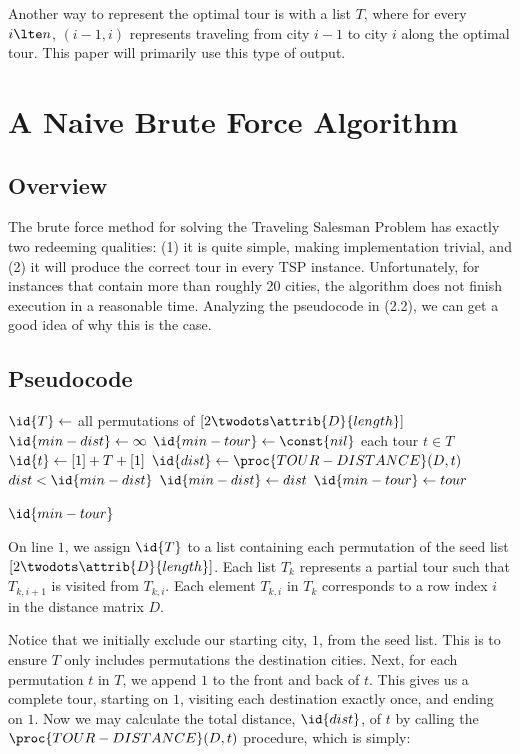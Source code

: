 \documentclass[11pt,fleqn]{article}
\begin{document}
Another way to represent the optimal tour is with a list
$T$, where for every $i \lte n$, $(i-1, i)$ represents
traveling from city $i-1$ to city $i$ along the optimal
tour.  This paper will primarily use this type of output.


\section{A Naive Brute Force Algorithm}
\subsection{Overview}
The brute force method for solving the Traveling Salesman Problem has exactly
two redeeming qualities: (1) it is quite simple, making implementation
trivial, and (2) it will produce the correct tour in every TSP instance.
Unfortunately, for instances that contain more than roughly 20 cities, the
algorithm does not finish execution in a reasonable time.  Analyzing the
pseudocode in (2.2), we can get a good idea of why this is the case.
\par
\vspace{0.5cm}


\subsection{Pseudocode}
\begin{codebox}
\li $\id{T} \gets$ all permutations of $[2 \twodots \attrib{D}{length}]$
\li $\id{min-dist} \gets \infty$
\li $\id{min-tour} \gets \const{nil}$
\li \For each tour $t \in T$
\li   \Do
        $\id{t} \gets [1] + T + [1]$
\li       $\id{dist} \gets \proc{TOUR-DISTANCE}(D, t)$
\li	  \If $dist < \id{min-dist}$
\li	    \Then
              $\id{min-dist} \gets dist$
\li	      $\id{min-tour} \gets tour$
            \End
       \End

\li    \Return $\id{min-tour}$
\end{codebox}
 
On line $1$, we assign $\id{T}$ to a list containing each permutation of
the seed list $[2 \twodots \attrib{D}{length}]$.  Each list $T_k$ represents
a partial tour such that $T_{k,i+1}$ is visited from $T_{k,i}$.  Each element
$T_{k,i}$ in $T_k$ corresponds to a row index $i$ in the distance matrix $D$.
\par

Notice that we initially exclude our starting city, $1$, from the seed list.
This is to ensure $T$ only includes permutations the destination cities. Next,
for each permutation $t$ in $T$, we append $1$ to the front and back of $t$.
This gives us a complete tour, starting on $1$, visiting each destination
exactly once, and ending on $1$.  Now we may calculate the total distance,
$\id{dist}$, of $t$ by calling the $\proc{TOUR-DISTANCE}(D, t)$ procedure,
which is simply:
\end{document}
